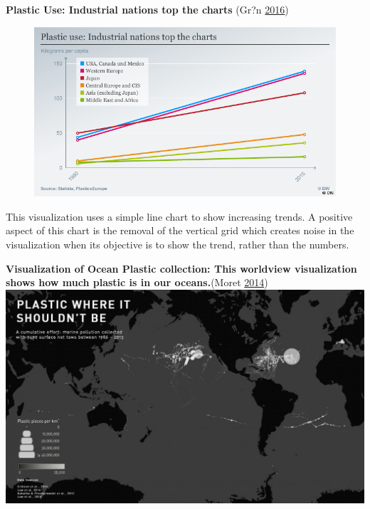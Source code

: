 \documentclass[]{book}
\theoremstyle{definition}
\theoremstyle{definition}
\theoremstyle{definition}
\theoremstyle{remark}
\begin{document}
\textbf{Plastic Use: Industrial nations top the charts} (Gr?n
\protect\hyperlink{ref-plastic_pollution_visualizations}{2016})

\begin{figure}
\centering
\includegraphics{images/plastic_use.png}
\caption{}
\end{figure}

This visualization uses a simple line chart to show increasing trends. A
positive aspect of this chart is the removal of the vertical grid which
creates noise in the visualization when its objective is to show the
trend, rather than the numbers.

\textbf{Visualization of Ocean Plastic collection: This worldview
visualization shows how much plastic is in our oceans.}(Moret
\protect\hyperlink{ref-ocean_plastic_pollution}{2014})
\includegraphics{images/Ocean_Plasticpollution.jpg}
\end{document}
